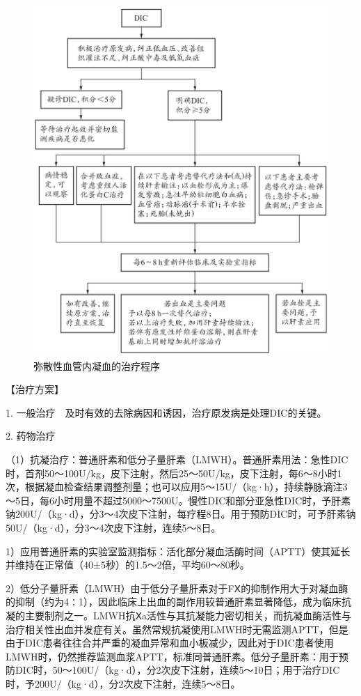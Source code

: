 \begin{figure}[!htbp]
 \centering
 \includegraphics{./images/Image00171.jpg}
 \captionsetup{justification=centering}
 \caption{弥散性血管内凝血的治疗程序}
 \label{fig5-5-3}
  \end{figure} 

【治疗方案】

1. 一般治疗　及时有效的去除病因和诱因，治疗原发病是处理DIC的关键。

2. 药物治疗

（1）抗凝治疗：普通肝素和低分子量肝素（LMWH）。普通肝素用法：急性DIC时，首剂50～100U/kg，皮下注射，然后25～50U/kg，皮下注射，每6～8小时1次，根据凝血检查结果调整剂量；也可以应用5～15U/（kg·h），持续静脉滴注3～5日，每6小时用量不超过5000～7500U。慢性DIC和部分亚急性DIC时，予肝素钠200U/（kg·d），分3～4次皮下注射，每疗程8日。用于预防DIC时，可予肝素钠50U/（kg·d），分3～4次皮下注射，连续5～8日。

1）应用普通肝素的实验室监测指标：活化部分凝血活酶时间（APTT）使其延长并维持在正常值（40±5秒）的1.5～2倍，平均60～80秒。

2）低分子量肝素（LMWH）由于低分子量肝素对于FⅩ的抑制作用大于对凝血酶的抑制（约为4∶1），因此临床上出血的副作用较普通肝素显著降低，成为临床抗凝的主要制剂之一。LMWH抗Ⅹa活性与其抗凝能力密切相关，而抗凝血酶活性与治疗相关性出血并发症有关。虽然常规抗凝使用LMWH时无需监测APTT，但是由于DIC患者往往合并严重的凝血异常和血小板减少，因此对于DIC患者使用LMWH时，仍然推荐监测血浆APTT，标准同普通肝素。低分子量肝素：用于预防DIC时，50～100U/（kg·d），分2次皮下注射，连续5～10日；用于治疗DIC时，予200U/（kg·d），分2次皮下注射，连续5～8日。

